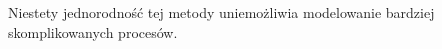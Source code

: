 Niestety jednorodność tej metody uniemożliwia modelowanie bardziej skomplikowanych procesów\cite{FormalizacjaAutomatów}.



















